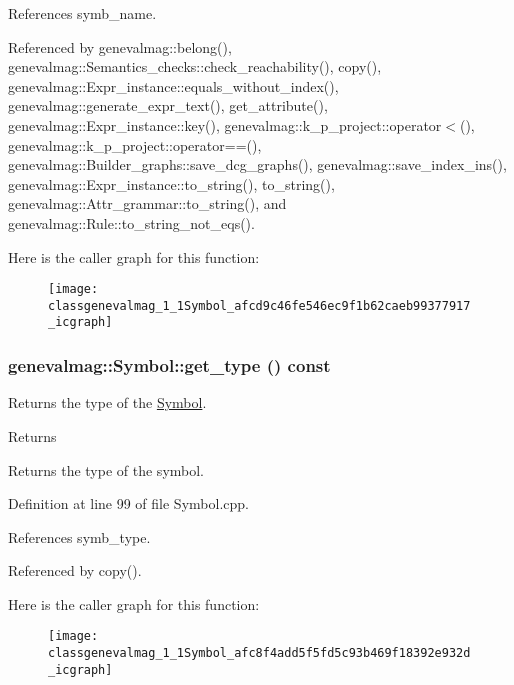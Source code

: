 References symb\_\-name.



Referenced by genevalmag::belong(), genevalmag::Semantics\_\-checks::check\_\-reachability(), copy(), genevalmag::Expr\_\-instance::equals\_\-without\_\-index(), genevalmag::generate\_\-expr\_\-text(), get\_\-attribute(), genevalmag::Expr\_\-instance::key(), genevalmag::k\_\-p\_\-project::operator$<$(), genevalmag::k\_\-p\_\-project::operator==(), genevalmag::Builder\_\-graphs::save\_\-dcg\_\-graphs(), genevalmag::save\_\-index\_\-ins(), genevalmag::Expr\_\-instance::to\_\-string(), to\_\-string(), genevalmag::Attr\_\-grammar::to\_\-string(), and genevalmag::Rule::to\_\-string\_\-not\_\-eqs().



Here is the caller graph for this function:\nopagebreak
\begin{figure}[H]
\begin{center}
\leavevmode
\texttt{[image: classgenevalmag\_1\_1Symbol\_afcd9c46fe546ec9f1b62caeb99377917\_icgraph]}
\end{center}
\end{figure}


\hypertarget{classgenevalmag_1_1Symbol_afc8f4add5f5fd5c93b469f18392e932d}{
\subsubsection[{get\_\-type}]{ genevalmag::Symbol::get\_\-type () const}}
\label{classgenevalmag_1_1Symbol_afc8f4add5f5fd5c93b469f18392e932d}
Returns the type of the \hyperlink{classgenevalmag_1_1Symbol}{Symbol}. \begin{DoxyReturn}{Returns}

\end{DoxyReturn}
Returns the type of the symbol. 

Definition at line 99 of file Symbol.cpp.



References symb\_\-type.



Referenced by copy().



Here is the caller graph for this function:\nopagebreak
\begin{figure}[H]
\begin{center}
\leavevmode
\texttt{[image: classgenevalmag\_1\_1Symbol\_afc8f4add5f5fd5c93b469f18392e932d\_icgraph]}
\end{center}
\end{figure}


